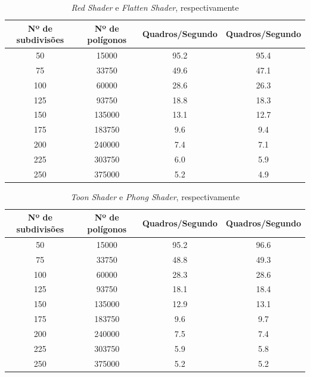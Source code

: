 \begin{table}[h]
	\centering
	\begin{tabular}{cccc}
		\toprule
		\textbf{Nº de subdivisões} & \textbf{Nº de polígonos} 
		& \textbf{Quadros/Segundo} & \textbf{Quadros/Segundo} \\
		\midrule
		50 & 15000 & 95.2 & 95.4 \\
		75 & 33750 & 49.6  & 47.1\\
		100 & 60000 & 28.6 & 26.3 \\
		125 & 93750 & 18.8  & 18.3 \\
		150 & 135000 & 13.1 & 12.7 \\
		175 & 183750 & 9.6 & 9.4 \\
		200 & 240000 & 7.4 & 7.1 \\
		225 & 303750 & 6.0 & 5.9 \\
		250 & 375000 & 5.2 & 4.9 \\
		\bottomrule
	\end{tabular}
	\caption{ \textit{Red Shader} e \textit{Flatten Shader}, respectivamente}
	\label{tab01}
\end{table}

\begin{table}[h]
	\centering	
	\begin{tabular}{cccc}
		\toprule
		\textbf{Nº de subdivisões} & \textbf{Nº de polígonos} & 
		\textbf{Quadros/Segundo} & \textbf{Quadros/Segundo}  \\
		\midrule
		50 & 15000 & 95.2  & 96.6\\
		75 & 33750 & 48.8  & 49.3\\
		100 & 60000 &  28.3 & 28.6\\
		125 & 93750 & 18.1 & 18.4\\
		150 & 135000 &  12.9 & 13.1\\
		175 & 183750 &  9.6 & 9.7\\
		200 & 240000 &  7.5 & 7.4\\
		225 & 303750 &  5.9 & 5.8\\
		250 & 375000 &  5.2 & 5.2\\
		\bottomrule
	\end{tabular}
	\caption{ \textit{Toon Shader} e \textit{Phong Shader}, respectivamente}
	\label{tab02}
\end{table}

